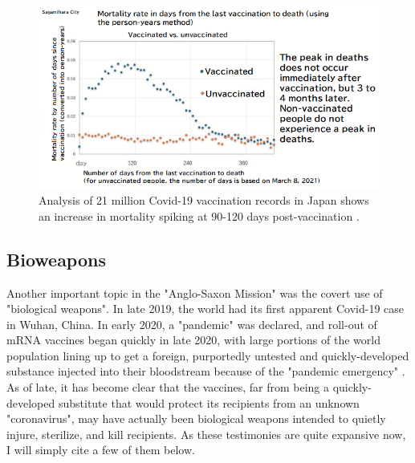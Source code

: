 \documentclass[10pt,twocolumn,letterpaper]{article}
\begin{document}
\clearpage
\twocolumn

\begin{figure}[t]
\begin{center}
\includegraphics[width=1\textwidth]{japan.png}
\end{center}
   \caption{Analysis of 21 million Covid-19 vaccination records in Japan shows an increase in mortality spiking at 90-120 days post-vaccination \cite{40,41}.}
   \label{fig:17}
\end{figure}

\subsection{Bioweapons}

Another important topic in the "Anglo-Saxon Mission" was the covert use of "biological weapons". In late 2019, the world had its first apparent Covid-19 case in Wuhan, China. In early 2020, a "pandemic" was declared, and roll-out of mRNA vaccines began quickly in late 2020, with large portions of the world population lining up to get a foreign, purportedly untested and quickly-developed substance injected into their bloodstream because of the "pandemic emergency" \cite{31}. As of late, it has become clear that the vaccines, far from being a quickly-developed substitute that would protect its recipients from an unknown "coronavirus", may have actually been biological weapons intended to quietly injure, sterilize, and kill recipients. As these testimonies are quite expansive now, I will simply cite a few of them below.
\end{document}
